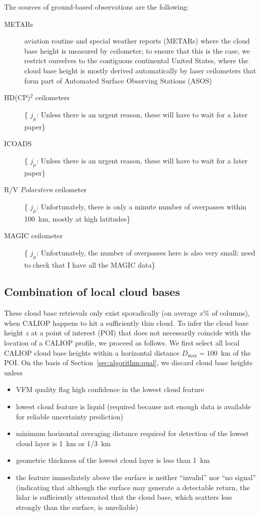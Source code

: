 \documentclass[amt,manuscript]{copernicus}\usepackage[]{graphicx}\usepackage[]{color}
\newcommand{\hlnum}[1]{\textcolor[rgb]{0.686,0.059,0.569}{#1}}%
\newcommand\comment[2]{\{\hlnum{ \textit{#1}: #2}\}}
\newcommand\commentjm[1]{\comment{$j_\mu$}{#1}}
\begin{document}
The sources of ground-based observations are the following:
\begin{description}
\item[METARs] aviation routine and special weather reports (METARs) where the
  cloud base height is measured by ceilometer; to ensure that this is the case,
  we restrict ourselves to the contiguous continental United States, where the
  cloud base height is mostly derived automatically by laser ceilometers that
  form part of Automated Surface Observing Stations (ASOS)
\item[HD(CP)$^2$ ceilometers] \commentjm{Unless there is an urgent reason, these
    will have to wait for a later paper}
\item[ICOADS] \commentjm{Unless there is an urgent reason, these
    will have to wait for a later paper}
\item[R/V \textit{Polarstern} ceilometer] \commentjm{Unfortunately, there is
    only a minute number of overpasses within 100~km, mostly at high latitudes}
\item[MAGIC ceilometer] \commentjm{Unfortunately, the number of overpasses here
    is also very small; need to check that I have all the MAGIC data}
\end{description}

\subsection{Combination of local cloud bases}
\label{sec:algorithm:combination}
These cloud base retrievals only exist sporadically (on average $x$\% of
columns), when CALIOP happens to hit a sufficiently thin cloud.  To infer the
cloud base height $z$ at a point of interest (POI) that does not necessarily
coincide with the location of a CALIOP profile, we proceed as follows.  We first
select all local CALIOP cloud base heights within a horizontal distance
$D_\text{max} = 100$~km of the POI.  On the basis of Section~\ref{sec:algorithm:qual}, we
discard cloud base heights unless
\begin{itemize}
\item VFM quality flag high confidence in the lowest cloud feature
\item lowest cloud feature is liquid (required because not enough data is
  available for reliable uncertainty prediction)
\item minimum horizontal averaging distance required for detection of the lowest
  cloud layer is 1~km or 1/3~km
\item geometric thickness of the lowest cloud layer is less than 1~km
\item the feature immediately above the surface is neither ``invalid'' nor ``no
  signal'' (indicating that although the surface may generate a detectable
  return, the lidar is sufficiently attenuated that the cloud base, which
  scatters less strongly than the surface, is unreliable)
\end{itemize}
\end{document}
